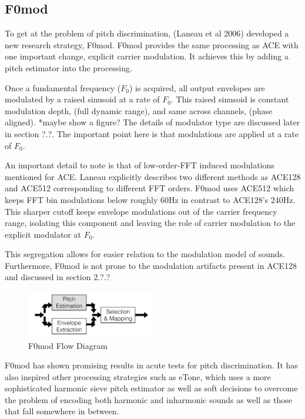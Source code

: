 \documentclass [11pt, proquest] {uwthesis}[2015/03/03]
\begin{document}
\subsection{F0mod}

To get at the problem of pitch discrimination, (Laneau et al 2006) developed a new research strategy, F0mod.  F0mod provides the same processing as ACE with one important change, explicit carrier modulation.  It achieves this by adding a pitch estimator into the processing.

Once a fundamental frequency ($F_0$) is acquired, all output envelopes are modulated by a raised sinusoid at a rate of $F_0$.  This raised sinusoid is constant modulation depth, (full dynamic range), and same across channels, (phase aligned).  *maybe show a figure?  The details of modulator type are discussed later in section ?.?.  The important point here is that modulations are applied at a rate of $F_0$.

An important detail to note is that of low-order-FFT induced modulations mentioned for ACE.  Laneau explicitly describes two different methods as ACE128 and ACE512 corresponding to different FFT orders.  F0mod uses ACE512 which keeps FFT bin modulations below roughly 60Hz in contrast to ACE128's 240Hz.  This sharper cutoff keeps envelope modulations out of the carrier frequency range, isolating this component and leaving the role of carrier modulation to the explicit modulator at $F_0$.

This segregation allows for easier relation to the modulation model of sounds.  Furthermore, F0mod is not prone to the modulation artifacts present in ACE128 and discussed in section 2.?.?

\begin{figure}[!ht]
  \centering
    \includegraphics[width=0.5\textwidth]{F0mod_flow_diagramTEMP}   
    \caption{F0mod Flow Diagram}
\end{figure}

F0mod has shown promising results in acute tests for pitch discrimination.  It has also inspired other processing strategies such as eTone, which uses a more sophisticated harmonic sieve pitch estimator as well as soft decisions to overcome the problem of encoding both harmonic and inharmonic sounds as well as those that fall somewhere in between.
\end{document}
